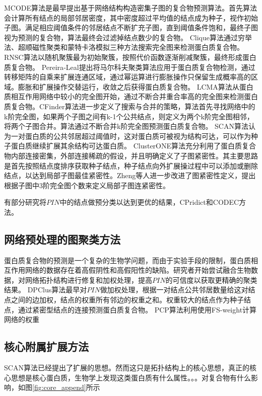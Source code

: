 MCODE算法\cite{bader_automated_2003}是最早提出基于网络结构构造密集子图的复合物预测算法。首先算法会计算所有结点的局部邻居密度，其中密度超过平均值的结点成为种子，视作初始子图。满足相应阈值条件的邻居结点不断扩充子图，直到阈值条件饱和，最终子图视为预测的复合物，算法最终会过滤掉结点数少的复合物。
Clique算法\cite{spirin_protein_2003}通过穷举法、超顺磁性聚类和蒙特卡洛模拟三种方法搜索完全图来检测蛋白质复合物。
RNSC算法\cite{king_protein_2004}以随机聚簇最为初始聚簇，按照代价函数逐渐削减聚簇，最终形成蛋白质复合物。
Pereira‐Leal\cite{pereiraleal_detection_2004}提出将马尔科夫聚类算法应用于蛋白质复合物检测，通过转移矩阵的自乘来扩展连通区域，通过幂运算进行膨胀操作只保留生成概率高的区域。膨胀和扩展操作交替运行，收敛之后获得蛋白质复合物。
LCMA算法\cite{li_interaction_2005}从蛋白质相互作用网络中较小的完全图开始，通过不断合并重合率高的完全图来检测蛋白质复合物。CFinder算法\cite{adamcsek_cfinder_2006}进一步定义了搜索与合并的策略，算法首先寻找网络中的k阶完全图，如果两个子图之间有k-1个公共结点，则定义为两个k阶完全图相邻，将两个子图合并。算法通过不断合并k阶完全图预测蛋白质复合物。
SCAN算法\cite{mete_structural_2008}认为一对蛋白质的公共邻居超过阈值时，这对蛋白质可被视为结构可达，可以作为种子蛋白质继续扩展其余结构可达蛋白质。
ClusterONE算法\cite{nepusz_detecting_2012}充分利用了蛋白质复合物内部连接密集，外部连接稀疏的假设，并且明确定义了子图紧密性。其主要思路是首先按照结点度排序获取种子结点，种子结点向外扩展操过程中可以添加或删除结点，以达到局部子图最佳紧密性。Zheng等人\cite{zheng_jiyu_2020}进一步改进了图紧密性定义，提出根据子图中3阶完全图个数来定义局部子图连紧密性。

有部分研究将$PIN$中的结点做预分类以达到更优的结果，CPridict和CODEC方法。

\subsection{网络预处理的图聚类方法}
\label{section:appendBiology}
蛋白质复合物的预测是一个复杂的生物学问题，而由于实验手段的限制，蛋白质相互作用网络的数据存在着高假阴性和高假阳性的缺陷\cite{von_mering_comparative_2002}。研究者开始尝试融合生物数据，对网络拓扑结构进行修复和加权处理，提高$PIN$的可信度以获取更精确的聚类结果。
DPClus算法\cite{altaf-ul-amin_development_2006}最早对$PIN$做加权处理，根据一对结点公共邻居数量给这对结点之间的边加权，结点的权重所有邻边的权重之和。权重较大的结点作为种子结点，通过紧密型结点的连接预测蛋白质复合物。
PCP算法\cite{chua_using_2008}利用使用FS-weight计算网络的权重

\subsection{核心附属扩展方法}
\label{section:CoreAppend}
SCAN算法\cite{mete_structural_2008}已经提出了扩展的思想。然而这只是拓扑结构上的核心思想，真正的核心思想是核心蛋白质，生物学上发现这类蛋白质有什么属性。。。对复合物有什么影响，如图\ref{fig:core_append}所示

